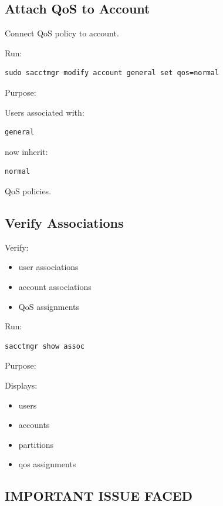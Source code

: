 \documentclass[11pt]{article}
\begin{document}
\subsection{Attach QoS to Account}
\label{sec:orgb55e32f}

Connect QoS policy to account.

Run:

\begin{verbatim}
sudo sacctmgr modify account general set qos=normal
\end{verbatim}

Purpose:

Users associated with:

\begin{verbatim}
general
\end{verbatim}

now inherit:

\begin{verbatim}
normal
\end{verbatim}

QoS policies.
\subsection{Verify Associations}
\label{sec:orgce5d691}

Verify:

\begin{itemize}
\item user associations
\item account associations
\item QoS assignments
\end{itemize}

Run:

\begin{verbatim}
sacctmgr show assoc
\end{verbatim}

Purpose:

Displays:

\begin{itemize}
\item users
\item accounts
\item partitions
\item qos assignments
\end{itemize}
\subsection{IMPORTANT ISSUE FACED}
\label{sec:orgcac201d}
\end{document}
